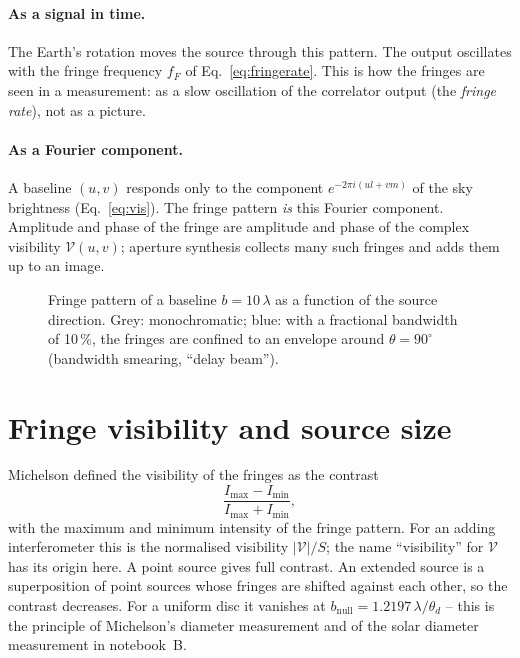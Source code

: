 \paragraph*{As a signal in time.} The Earth's rotation moves the source
through this pattern. The output oscillates with the fringe frequency
$f_F$ of Eq.~\eqref{eq:fringerate}. This is how the fringes are seen in
a measurement: as a slow oscillation of the correlator output (the
\emph{fringe rate}), not as a picture.

\paragraph*{As a Fourier component.} A baseline $(u,v)$ responds only to
the component $e^{-2\pi i(ul+vm)}$ of the sky brightness
(Eq.~\eqref{eq:vis}). The fringe pattern \emph{is} this Fourier
component. Amplitude and phase of the fringe are amplitude and phase
of the complex visibility $\mathcal V(u,v)$; aperture synthesis
collects many such fringes and adds them up to an image.

\begin{figure}[htbp]
  \centering
  
  \caption{Fringe pattern of a baseline $b = 10\,\lambda$ as a function
           of the source direction. Grey: monochromatic; blue: with a
           fractional bandwidth of 10\,\%, the fringes are confined to
           an envelope around $\theta = 90^\circ$ (bandwidth smearing,
           \enquote{delay beam}).}
  \label{fig:fringe-pattern}
\end{figure}

\section{Fringe visibility and source size}

Michelson defined the visibility of the fringes as the contrast
\begin{equation}
  \frac{I_{\max}-I_{\min}}{I_{\max}+I_{\min}} ,
\end{equation}
with the maximum and minimum intensity of the fringe pattern. For an
adding interferometer this is the normalised visibility
$|\mathcal V|/S$; the name \enquote{visibility} for $\mathcal V$ has its
origin here. A point source gives full contrast. An extended source
is a superposition of point sources whose fringes are shifted against
each other, so the contrast decreases. For a uniform disc it vanishes
at $b_{\mathrm{null}} = 1.2197\,\lambda/\theta_d$ -- this is the
principle of Michelson's diameter measurement and of the solar
diameter measurement in notebook~B.

